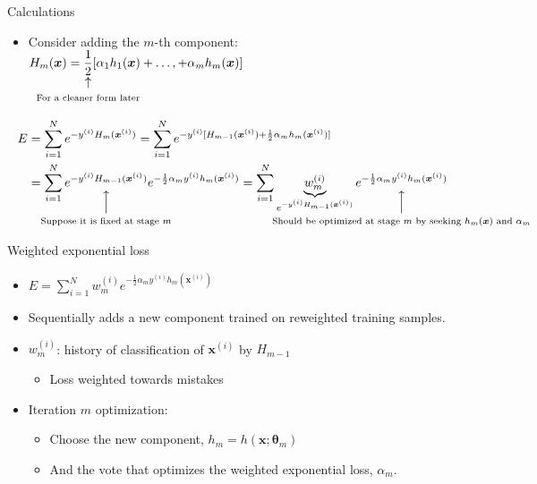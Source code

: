\documentclass[serif, aspectratio=169]{beamer}
\makeatletter
\newcommand\vertarrowbox[3][6ex]{%
  \begin{array}[t]{@{}c@{}} #2 \\
  \left\uparrow\vcenter{\hrule height #1}\right.\kern-\nulldelimiterspace\\
  \makebox[0pt]{\scriptsize#3}
  \end{array}%
}
\makeatother
\begin{document}
\begin{frame}{Calculations}
    \begin{itemize}
        \itemsep1em
        \justifying
        \item Consider adding the $m$-th component: \hfill $H_m(\boldsymbol{x}) = 
        \text{\vertarrowbox[0ex]{\dfrac{1}{2}}{For a cleaner form later}}
        [\alpha_1h_1(\boldsymbol{x})+\dots,+\alpha_mh_m(\boldsymbol{x})]$
    \end{itemize}
    \begin{align*}
        E &= \displaystyle\sum_{i=1}^N e^{-y^{(i)}H_m(\boldsymbol{x}^{(i)})} = \displaystyle\sum_{i=1}^N e^{-y^{(i)}[H_{m-1}(\boldsymbol{x}^{(i)}) + \frac{1}{2}\alpha_mh_m(\boldsymbol{x}^{(i)})]} \\
        &=\displaystyle\sum_{i=1}^N
        \text{\vertarrowbox[4ex]{e^{-y^{(i)}H_{m-1}(\boldsymbol{x}^{(i)})}}{Suppose it is fixed at stage $m$}}
        e^{-\frac{1}{2}\alpha_my^{(i)}h_m(\boldsymbol{x}^{(i)})}
        =\displaystyle\sum_{i=1}^N \underbrace{w_m^{(i)}}_{e^{-y^{(i)}H_{m-1}(\boldsymbol{x}^{(i)})}} 
        \text{\vertarrowbox[4ex]{e^{-\frac{1}{2}\alpha_my^{(i)}h_m(\boldsymbol{x}^{(i)})}}{Should be optimized at stage $m$ by seeking $h_m(\boldsymbol{x})$ and $\alpha_m$}}
    \end{align*}
\end{frame}

\begin{frame}{Weighted exponential loss}
    \begin{itemize}
        \itemsep1em
        \justifying
        \item[] \begin{center}
            $E=\displaystyle\sum_{i=1}^N w_m^{(i)} e^{-\frac{1}{2}\alpha_my^{(i)}h_m(\boldsymbol{x}^{(i)})}$
        \end{center}
        \item Sequentially adds a new component trained on reweighted training samples.
        \item $w_m^{(i)}$: history of classification of $\boldsymbol{x}^{(i)}$ by $H_{m-1}$
        \begin{itemize}
            \item Loss weighted towards mistakes
        \end{itemize}
        \item Iteration $m$ optimization:
        \begin{itemize}
            \itemsep0.25em
            \item Choose the new component, $h_m=h(\boldsymbol{x};\boldsymbol{\theta}_m)$
            \item And the vote that optimizes the weighted exponential loss, $\alpha_m$.
        \end{itemize}
    \end{itemize}
\end{frame}
\end{document}
